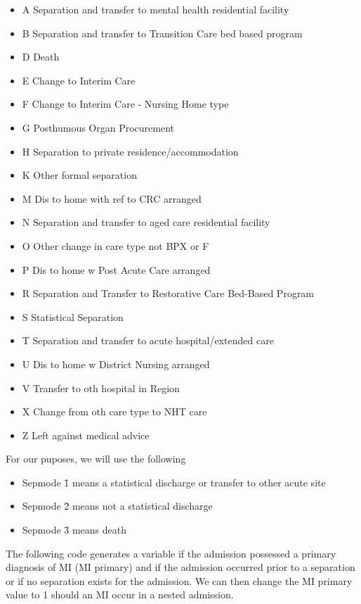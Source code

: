 \documentclass[11pt]{article}
\begin{document}
\begin{itemize}
\item A	Separation and transfer to mental health residential facility
\item B	Separation and transfer to Transition Care bed based program
\item D	Death
\item E	Change to Interim Care
\item F	Change to Interim Care - Nursing Home type
\item G	Posthumous Organ Procurement
\item H	Separation to private residence/accommodation
\item K	Other formal separation
\item M	Dis to home with ref to CRC arranged
\item N	Separation and transfer to aged care residential facility
\item O	Other change in care type not BPX or F
\item P	Dis to home w Post Acute Care arranged
\item R	Separation and Transfer to Restorative Care Bed-Based Program
\item S	Statistical Separation
\item T	Separation and transfer to acute hospital/extended care
\item U	Dis to home w District Nursing arranged
\item V	Transfer to oth hospital in Region
\item X	Change from oth care type to NHT care
\item Z	Left against medical advice
\end{itemize}

For our puposes, we will use the following
\begin{itemize}
\item Sepmode \= 1 means a statistical discharge or transfer to other acute site
\item Sepmode \= 2 means not a statistical discharge
\item Sepmode \= 3 means death 
\end{itemize}

The following code generates a variable if the admission possessed a primary diagnosis of MI (MI primary) and if the admission occurred prior to a separation or if no separation exists for the admission. We can then change the MI primary value to 1 should an MI occur in a nested admission.
\end{document}
